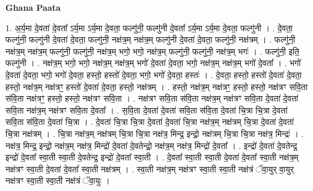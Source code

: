 \documentclass[17pt]{extarticle}
\begin{document}
\textbf{Ghana Paata } \newline

1. अ॒र्य॒मा दे॒वता॑ दे॒वता᳚ ऽर्य॒मा ऽर्य॒मा दे॒वता॒ फल्गु॑नी॒ फल्गु॑नी दे॒वता᳚ ऽर्य॒मा ऽर्य॒मा दे॒वता॒ फल्गु॑नी । . दे॒वता॒ फल्गु॑नी॒ फल्गु॑नी दे॒वता॑ दे॒वता॒ फल्गु॑नी॒ नक्ष॑त्र॒म् नक्ष॑त्र॒म् फल्गु॑नी दे॒वता॑ दे॒वता॒ फल्गु॑नी॒ नक्ष॑त्रम् । . फल्गु॑नी॒ नक्ष॑त्र॒म् नक्ष॑त्र॒म् फल्गु॑नी॒ फल्गु॑नी॒ नक्ष॑त्र॒म् भगो॒ भगो॒ नक्ष॑त्र॒म् फल्गु॑नी॒ फल्गु॑नी॒ नक्ष॑त्र॒म् भगः॑ । . फल्गु॑नी॒ इति॒ फल्गु॑नी । . नक्ष॑त्र॒म् भगो॒ भगो॒ नक्ष॑त्र॒म् नक्ष॑त्र॒म् भगो॑ दे॒वता॑ दे॒वता॒ भगो॒ नक्ष॑त्र॒म् नक्ष॑त्र॒म् भगो॑ दे॒वता᳚ । . भगो॑ दे॒वता॑ दे॒वता॒ भगो॒ भगो॑ दे॒वता॒ हस्तो॒ हस्तो॑ दे॒वता॒ भगो॒ भगो॑ दे॒वता॒ हस्तः॑ । . दे॒वता॒ हस्तो॒ हस्तो॑ दे॒वता॑ दे॒वता॒ हस्तो॒ नक्ष॑त्र॒म् नक्ष॑त्रꣳ॒॒ हस्तो॑ दे॒वता॑ दे॒वता॒ हस्तो॒ नक्ष॑त्रम् । . हस्तो॒ नक्ष॑त्र॒म् नक्ष॑त्रꣳ॒॒ हस्तो॒ हस्तो॒ नक्ष॑त्रꣳ सवि॒ता स॑वि॒ता नक्ष॑त्रꣳ॒॒ हस्तो॒ हस्तो॒ नक्ष॑त्रꣳ सवि॒ता । . नक्ष॑त्रꣳ सवि॒ता स॑वि॒ता नक्ष॑त्र॒म् नक्ष॑त्रꣳ सवि॒ता दे॒वता॑ दे॒वता॑ सवि॒ता नक्ष॑त्र॒म् नक्ष॑त्रꣳ सवि॒ता दे॒वता᳚ । . स॒वि॒ता दे॒वता॑ दे॒वता॑ सवि॒ता स॑वि॒ता दे॒वता॑ चि॒त्रा चि॒त्रा दे॒वता॑ सवि॒ता स॑वि॒ता दे॒वता॑ चि॒त्रा । . दे॒वता॑ चि॒त्रा चि॒त्रा दे॒वता॑ दे॒वता॑ चि॒त्रा नक्ष॑त्र॒म् नक्ष॑त्रम् चि॒त्रा दे॒वता॑ दे॒वता॑ चि॒त्रा नक्ष॑त्रम् । . चि॒त्रा नक्ष॑त्र॒म् नक्ष॑त्रम् चि॒त्रा चि॒त्रा नक्ष॑त्र॒ मिन्द्र॒ इन्द्रो॒ नक्ष॑त्रम् चि॒त्रा चि॒त्रा नक्ष॑त्र॒ मिन्द्रः॑ । . नक्ष॑त्र॒ मिन्द्र॒ इन्द्रो॒ नक्ष॑त्र॒म् नक्ष॑त्र॒ मिन्द्रो॑ दे॒वता॑ दे॒वतेन्द्रो॒ नक्ष॑त्र॒म् नक्ष॑त्र॒ मिन्द्रो॑ दे॒वता᳚ । . इन्द्रो॑ दे॒वता॑ दे॒वतेन्द्र॒ इन्द्रो॑ दे॒वता᳚ स्वा॒ती स्वा॒ती दे॒वतेन्द्र॒ इन्द्रो॑ दे॒वता᳚ स्वा॒ती । . दे॒वता᳚ स्वा॒ती स्वा॒ती दे॒वता॑ दे॒वता᳚ स्वा॒ती नक्ष॑त्र॒म् नक्ष॑त्रꣳ स्वा॒ती दे॒वता॑ दे॒वता᳚ स्वा॒ती नक्ष॑त्रम् । . स्वा॒ती नक्ष॑त्र॒म् नक्ष॑त्रꣳ स्वा॒ती स्वा॒ती नक्ष॑त्रं ॅवा॒युर् वा॒युर् नक्ष॑त्रꣳ स्वा॒ती स्वा॒ती नक्ष॑त्रं ॅवा॒युः । \newline
\end{document}
